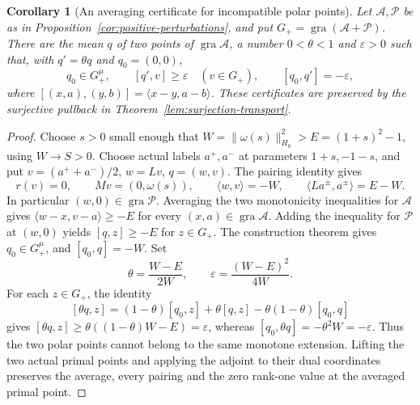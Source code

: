 \documentclass[11pt]{article}
\newcommand{\gra}{\operatorname{gra}}
\newcommand{\pair}[2]{\langle #1,#2\rangle}
\newtheorem{corollary}{Corollary}
\theoremstyle{definition}
\theoremstyle{remark}
\begin{document}
\begin{corollary}[An averaging certificate for incompatible polar points]
\label{cor:averaging-recovered}
Let $\mathcal A,\mathcal P$ be as in Proposition~\ref{cor:positive-perturbations}, and put $G_+=\gra(\mathcal A+\mathcal P)$. There are the mean $q$ of two points of $\gra\mathcal A$, a number $0<\theta<1$ and $\varepsilon>0$ such that, with $q'=\theta q$ and $q_0=(0,0)$,
\[
q_0\in G_+^\mu,\qquad [q',v]\ge\varepsilon\quad(v\in G_+),\qquad
[q_0,q']=-\varepsilon,
\]
where $[(x,a),(y,b)]=\pair{x-y}{a-b}$. These certificates are preserved by the surjective pullback in Theorem~\ref{lem:surjection-transport}.
\end{corollary}
\begin{proof}
Choose $s>0$ small enough that $W=\|\omega(s)\|_{H_0}^2>E=(1+s)^2-1$, using $W\to S>0$. Choose actual labels $a^+,a^-$ at parameters $1+s,-1-s$, and put $v=(a^++a^-)/2$, $w=Lv$, $q=(w,v)$. The pairing identity gives
\[
r(v)=0,\qquad Mv=(0,\omega(s)),\qquad
\pair{w}{v}=-W,\qquad
\pair{La^\pm}{a^\pm}=E-W.
\]
In particular $(w,0)\in\gra\mathcal P$. Averaging the two monotonicity inequalities for $\mathcal A$ gives $\pair{w-x}{v-a}\ge-E$ for every $(x,a)\in\gra\mathcal A$. Adding the inequality for $\mathcal P$ at $(w,0)$ yields $[q,z]\ge-E$ for $z\in G_+$. The construction theorem gives $q_0\in G_+^\mu$, and $[q_0,q]=-W$. Set
\[
\theta=\frac{W-E}{2W},\qquad \varepsilon=\frac{(W-E)^2}{4W}.
\]
For each $z\in G_+$, the identity
\[
[\theta q,z]=(1-\theta)[q_0,z]+\theta[q,z]-\theta(1-\theta)[q_0,q]
\]
gives $[\theta q,z]\ge\theta((1-\theta)W-E)=\varepsilon$, whereas $[q_0,\theta q]=-\theta^2W=-\varepsilon$. Thus the two polar points cannot belong to the same monotone extension. Lifting the two actual primal points and applying the adjoint to their dual coordinates preserves the average, every pairing and the zero rank-one value at the averaged primal point.
\end{proof}

\begingroup
\raggedright 

\endgroup
\end{document}
